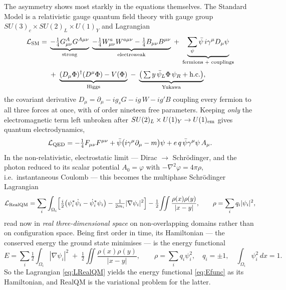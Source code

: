 \documentclass[11pt]{article}
\begin{document}
The asymmetry shows most starkly in the equations themselves. The Standard Model is a relativistic gauge
quantum field theory with gauge group $SU(3)_c\times SU(2)_L\times U(1)_Y$ and Lagrangian
\begin{equation}
\begin{aligned}
\mathcal L_{\rm SM}=\;&\underbrace{-\tfrac14 G^A_{\mu\nu}G^{A\mu\nu}}_{\text{strong}}
\;\underbrace{-\tfrac14 W^a_{\mu\nu}W^{a\mu\nu}-\tfrac14 B_{\mu\nu}B^{\mu\nu}}_{\text{electroweak}}
\;+\;\underbrace{\sum_\psi\bar\psi\,i\gamma^\mu D_\mu\psi}_{\text{fermions + couplings}}\\[3pt]
&+\;\underbrace{(D_\mu\Phi)^\dagger(D^\mu\Phi)-V(\Phi)}_{\text{Higgs}}
\;-\;\underbrace{\big(\textstyle\sum y\,\bar\psi_L\Phi\,\psi_R+\text{h.c.}\big)}_{\text{Yukawa}},
\end{aligned}
\label{eq:SM}
\end{equation}
the covariant derivative $D_\mu=\partial_\mu-ig_s G-ig\,W-ig'B$ coupling every fermion to all three forces
at once, with of order nineteen free parameters. Keeping \emph{only} the electromagnetic term left
unbroken after $SU(2)_L\times U(1)_Y\to U(1)_{\rm em}$ gives quantum electrodynamics,
\begin{equation}
\mathcal L_{\rm QED}=-\tfrac14 F_{\mu\nu}F^{\mu\nu}+\bar\psi\big(i\gamma^\mu\partial_\mu-m\big)\psi
+e\,q\,\bar\psi\gamma^\mu\psi\,A_\mu .
\label{eq:QED}
\end{equation}
In the non-relativistic, electrostatic limit --- Dirac $\to$ Schr\"odinger, and the photon reduced to its
scalar potential $A_0=\varphi$ with $-\nabla^2\varphi=4\pi\rho$, i.e.\ instantaneous Coulomb --- this
becomes the multiphase Schr\"odinger Lagrangian
\begin{equation}
\mathcal L_{\rm RealQM}=\sum_i\int_{\Omega_i}\!\Big[\tfrac{i}{2}\big(\psi_i^*\dot\psi_i-\dot\psi_i^*\psi_i\big)
-\tfrac{1}{2m_i}|\nabla\psi_i|^2\Big]-\tfrac12\!\iint\frac{\rho(x)\rho(y)}{|x-y|},\qquad
\rho=\sum_i q_i|\psi_i|^2,
\label{eq:LRealQM}
\end{equation}
read now in \emph{real three-dimensional space} on non-overlapping domains rather than on configuration
space. Being first order in time, its Hamiltonian --- the conserved energy the ground state minimises ---
is the energy functional
\begin{equation}
E=\sum_i\tfrac12\!\int_{\Omega_i}|\nabla\psi_i|^2\;+\;\tfrac12\!\iint\frac{\rho(x)\rho(y)}{|x-y|},\qquad
\rho=\sum_i q_i\psi_i^2,\quad q_i=\pm1,\quad \int_{\Omega_i}\psi_i^2\,dx=1.
\label{eq:Efunc}
\end{equation}
So the Lagrangian \eqref{eq:LRealQM} yields the energy functional \eqref{eq:Efunc} as its Hamiltonian, and
RealQM is the variational problem for the latter.
\end{document}
